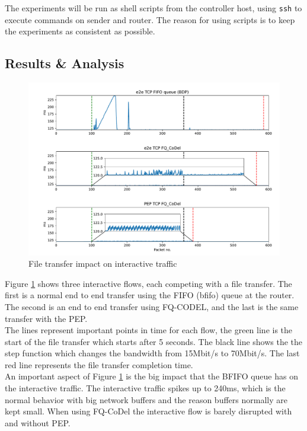 \documentclass[a4paper,english, 11pt]{report}
\begin{document}
The experiments will be run as shell scripts from the controller host, using \verb|ssh| to execute commands on sender and router. The reason for using scripts is to keep the experiments as consistent as possible.

\subsection{Results \& Analysis}

\begin{figure}[h!] %
	\centering
	\includegraphics[scale=0.45]{../diagrams/graphs/final2.pdf}
  	\caption{File transfer impact on interactive traffic}
  	\label{fig:graph1}
\end{figure}

Figure \ref{fig:graph1} shows three interactive flows, each competing with a file transfer. The first is a normal end to end transfer using the FIFO (bfifo) queue at the router. The second is an end to end transfer using FQ-CODEL, and the last is the same transfer with the PEP.\\

The lines represent important points in time for each flow, the green line is the start of the file transfer which starts after 5 seconds. The black line shows the the step function which changes the bandwidth from 15Mbit/s to 70Mbit/s. The last red line represents the file transfer completion time.\\

An important aspect of Figure \ref{fig:graph1} is the big impact that the BFIFO queue has on the interactive traffic. The interactive traffic spikes up to 240ms, which is the normal behavior with big network buffers and the reason buffers normally are kept small. When using FQ-CoDel the interactive flow is barely disrupted with and without PEP.\\
\end{document}

